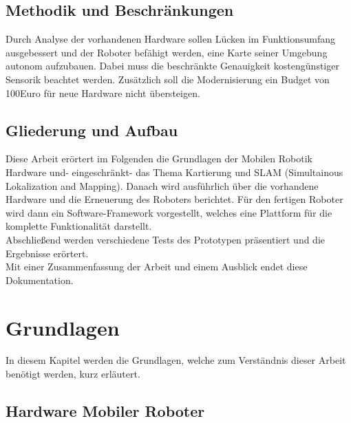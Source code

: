 \documentclass[twoside,11pt, a4paper]{report}
\begin{document}
	
	\section{Methodik und Beschränkungen}
	
	Durch Analyse der vorhandenen Hardware sollen Lücken im Funktionsumfang ausgebessert und der Roboter befähigt werden, eine Karte seiner Umgebung autonom aufzubauen. 
	Dabei muss die beschränkte Genauigkeit kostengünstiger Sensorik beachtet werden. Zusätzlich soll die Modernisierung ein Budget von 100Euro für neue Hardware nicht übersteigen. 
	
	\section{Gliederung und Aufbau}
	
	Diese Arbeit erörtert im Folgenden die Grundlagen der Mobilen Robotik Hardware und- eingeschränkt- das Thema Kartierung und SLAM (Simultainous Lokalization and Mapping). Danach wird ausführlich über die vorhandene Hardware und die Erneuerung des Roboters berichtet. Für den fertigen Roboter wird dann ein Software-Framework vorgestellt, welches eine Plattform für die komplette Funktionalität darstellt. \\
	Abschließend werden verschiedene  Tests des Prototypen präsentiert und die Ergebnisse erörtert. \\
	Mit einer Zusammenfassung der Arbeit und einem Ausblick endet diese Dokumentation.  
	
	
	
	
	
	\chapter{Grundlagen}
	In diesem Kapitel werden die Grundlagen, welche zum Verständnis dieser Arbeit benötigt werden, kurz erläutert.
	
	\section{Hardware Mobiler Roboter}
\end{document}
